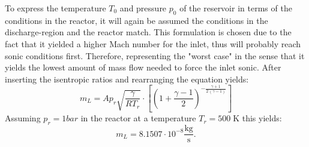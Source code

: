 	To express the temperature $T_0$ and pressure $p_0$ of the reservoir in terms of the conditions in the reactor, it will again be assumed the conditions in the discharge-region and the reactor match.
	This formulation is chosen due to the fact that it yielded a higher Mach number for the inlet, thus will probably reach sonic conditions first.
	Therefore, representing the "worst case" in the sense that it yields the lowest amount of mass flow needed to force the inlet sonic.
	After inserting the isentropic ratios and rearranging the equation yields:
	$$
		m_L =
		A p_r\sqrt{\frac{\gamma}{R T_r}}\cdot
		\left[
			\left(
				1 + \frac{\gamma - 1}{2}
			\right)
				^{-\frac{\gamma + 1}{2\,(\gamma - 1)}}
		\right]
	$$
	Assuming $p_r = 1 bar$ in the reactor at a temperature $T_r = 500\;\text{K}$ this yields:
	$$
		m_L = 8.1507\cdot 10^{-8}\frac{\text{kg}}{\text{s}}.
	$$	
